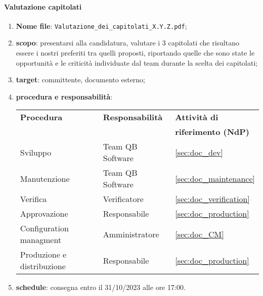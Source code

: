         \paragraph{Valutazione capitolati}
            \begin{enumerate}
                \item \textbf{Nome file}: \texttt{Valutazione\_dei\_capitolati\_X.Y.Z.pdf};
                \item \textbf{scopo}: presentarsi alla candidatura, valutare i 3 capitolati che risultano essere i nostri preferiti tra quelli proposti, riportando quelle che sono state le opportunità e le criticità individuate dal team durante la scelta dei capitolati;
                \item \textbf{target}: committente, documento esterno;
                \item \textbf{procedura e responsabilità}:
                \\
                \begin{tabularx}{0.93\textwidth}{|X|X|X|}
                    \hline
                    \textbf{Procedura} & \textbf{Responsabilità} & \textbf{Attività di} \\
                    & & \textbf{riferimento (NdP)} \\
                    \hline
                    Sviluppo & Team QB Software &  \ref{sec:doc_dev}
                    \\\hline
                    Manutenzione & Team QB Software & \ref{sec:doc_maintenance}
                    \\\hline
                    Verifica & Verificatore & \ref{sec:doc_verification}
                    \\\hline
                    Approvazione & Responsabile & \ref{sec:doc_production}
                    \\\hline
                    Configuration managment & Amministratore & \ref{sec:doc_CM}
                    \\\hline
                    Produzione e distribuzione & Responsabile & \ref{sec:doc_production}
                    \\\hline
                \end{tabularx}
                \item \textbf{schedule}: consegna entro il 31/10/2023 alle ore 17:00.
            \end{enumerate} 
            
